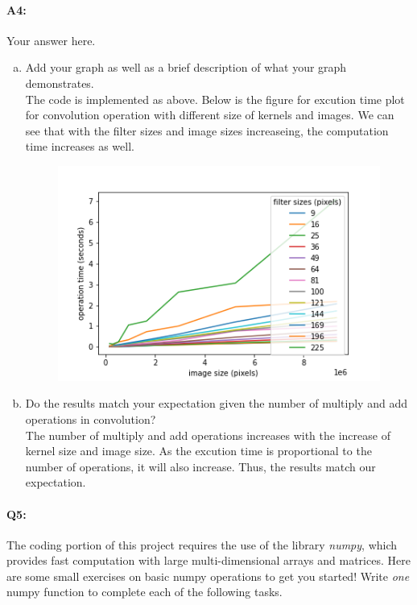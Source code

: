 \pagebreak
\paragraph{A4:} Your answer here.

\begin{enumerate}[(a)]

\item Add your graph as well as a brief description of what your graph demonstrates. \\
The code is implemented as above. Below is the figure for excution time plot for convolution operation with different size of kernels and images. We can see that with the filter sizes and image sizes increaseing, the computation time increases as well.

\begin{figure}[htbp]
    \centering
    \includegraphics[scale=0.5]{A4.png}
\end{figure}
\item Do the results match your expectation given the number of multiply and add operations in convolution? \\
The number of multiply and add operations increases with the increase of kernel size and image size. As the excution time is proportional to the number of operations, it will also increase. Thus, the results match our expectation.

\end{enumerate}

\pagebreak 
\paragraph{Q5:} The coding portion of this project requires the use of the library \emph{numpy}, which provides fast computation with large multi-dimensional arrays and matrices. Here are some small exercises on basic numpy operations to get you started! Write \emph{one} numpy function to complete each of the following tasks.

